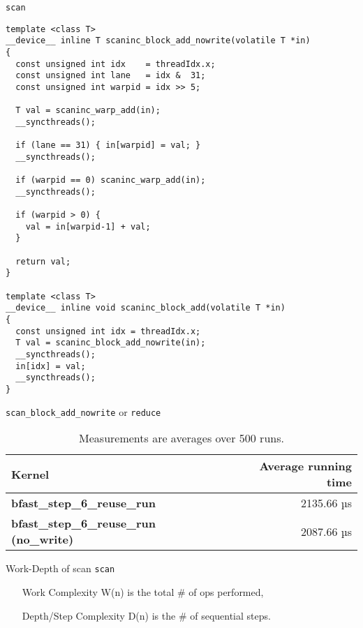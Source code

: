\begin{frame}[fragile]{\texttt{scan}}
\begin{verbatim}
template <class T>
__device__ inline T scaninc_block_add_nowrite(volatile T *in)
{
  const unsigned int idx    = threadIdx.x;
  const unsigned int lane   = idx &  31;
  const unsigned int warpid = idx >> 5;

  T val = scaninc_warp_add(in);
  __syncthreads();

  if (lane == 31) { in[warpid] = val; }
  __syncthreads();

  if (warpid == 0) scaninc_warp_add(in);
  __syncthreads();

  if (warpid > 0) {
    val = in[warpid-1] + val;
  }

  return val;
}

template <class T>
__device__ inline void scaninc_block_add(volatile T *in)
{
  const unsigned int idx = threadIdx.x;
  T val = scaninc_block_add_nowrite(in);
  __syncthreads();
  in[idx] = val;
  __syncthreads();
}
\end{verbatim}
\end{frame}

\begin{frame}[fragile]{\texttt{scan\_block\_add\_nowrite} or \texttt{reduce}}

    \begin{table}
        \centering
        \begin{tabular}{l r}
            \textbf{Kernel} & \textbf{Average running time} \\ \hline
            \textbf{bfast\_step\_6\_reuse\_run} &     2135.66 µs \\
            \textbf{bfast\_step\_6\_reuse\_run (no\_write)} &    2087.66 µs
        \end{tabular}
        \caption{Measurements are averages over 500 runs.}
        \label{tab:nowrite}
    \end{table}

\end{frame}

\begin{frame}[fragile]{Work-Depth of scan \texttt{scan}}

    \begin{enumerate}
        \item [Work Complexity W(n)] is the total \# of ops performed,
        \item [Depth/Step Complexity D(n)] is the \# of sequential steps.
    \end{enumerate}

\end{frame}
